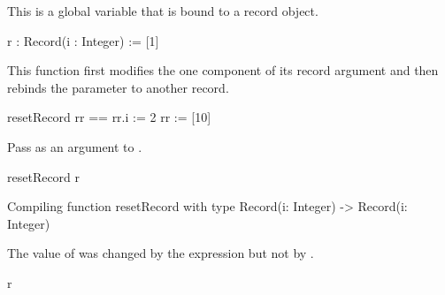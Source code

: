 \begin{xtc}
\begin{xtccomment}
This is a global variable that is bound to a record object.
\end{xtccomment}
\begin{spadsrc}
r : Record(i : Integer) := [1] 
\end{spadsrc}
\begin{TeXOutput}
\begin{fricasmath}{17}
%
\end{fricasmath}
\end{TeXOutput}
\end{xtc}
\begin{xtc}
\begin{xtccomment}
This function first modifies the one component of its
record argument and then rebinds the parameter to another
record.
\end{xtccomment}
\begin{spadsrc}
resetRecord rr ==
  rr.i := 2
  rr := [10]
\end{spadsrc}
\end{xtc}
\begin{xtc}
\begin{xtccomment}
Pass  as an argument to .
\end{xtccomment}
\begin{spadsrc}
resetRecord r 
\end{spadsrc}
\begin{MessageOutput}
   Compiling function resetRecord with type Record(i: Integer) -> 
      Record(i: Integer) 
\end{MessageOutput}
\begin{TeXOutput}
\begin{fricasmath}{19}
%
\end{fricasmath}
\end{TeXOutput}
\end{xtc}
\begin{xtc}
\begin{xtccomment}
The value of  was changed by the expression
 but not by .
\end{xtccomment}
\begin{spadsrc}
r 
\end{spadsrc}
\begin{TeXOutput}
\begin{fricasmath}{20}
%
\end{fricasmath}
\end{TeXOutput}
\end{xtc}

